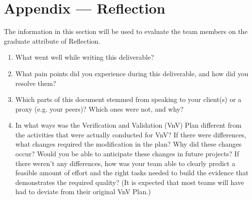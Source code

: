 \documentclass[12pt, titlepage]{article}
\begin{document}



\newpage{}
\section*{Appendix --- Reflection}

The information in this section will be used to evaluate the team members on the
graduate attribute of Reflection.



\begin{enumerate}
  \item What went well while writing this deliverable? 
  \item What pain points did you experience during this deliverable, and how
    did you resolve them?
  \item Which parts of this document stemmed from speaking to your client(s) or
  a proxy (e.g. your peers)? Which ones were not, and why?
  \item In what ways was the Verification and Validation (VnV) Plan different
  from the activities that were actually conducted for VnV?  If there were
  differences, what changes required the modification in the plan?  Why did
  these changes occur?  Would you be able to anticipate these changes in future
  projects?  If there weren't any differences, how was your team able to clearly
  predict a feasible amount of effort and the right tasks needed to build the
  evidence that demonstrates the required quality?  (It is expected that most
  teams will have had to deviate from their original VnV Plan.)
\end{enumerate}
\end{document}
